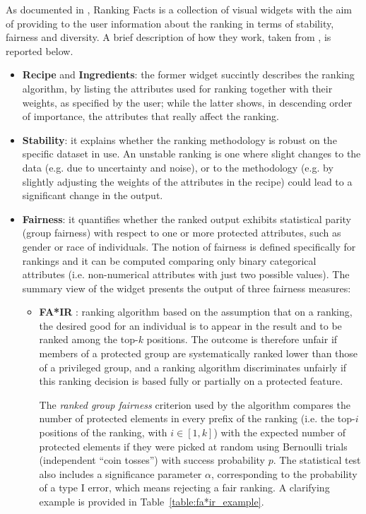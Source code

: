 As documented in \cite{yang2018nutritional}, Ranking Facts is a collection of visual widgets with the aim of providing to the user information about the ranking in terms of stability, fairness and diversity. A brief description of how they work, taken from \cite{yang2018nutritional}, is reported below.
\begin{itemize}
\item \textbf{Recipe} and \textbf{Ingredients}: the former widget succintly describes the ranking algorithm, by listing the attributes used for ranking together with their weights, as specified by the user; while the latter shows, in descending order of importance, the attributes that really affect the ranking.
\item \textbf{Stability}: it explains whether the ranking methodology is robust on the specific dataset in use. An unstable ranking is one where slight changes to the data (e.g. due to uncertainty and noise), or to the methodology (e.g. by slightly adjusting the weights of the attributes in the recipe) could lead to a significant change in the output.
\item \textbf{Fairness}: it quantifies whether the ranked output exhibits statistical parity (group fairness) with respect to one or more protected attributes, such as gender or race of individuals. The notion of fairness is defined specifically for rankings and it can be computed comparing only binary categorical attributes (i.e. non-numerical attributes with just two possible values). The summary view of the widget presents the output of three fairness measures:

\begin{itemize}
\item \textbf{FA*IR} \cite{zehlike2017fa*ir}: ranking algorithm based on the assumption that on a ranking, the desired good for an individual is to appear in the result and to be ranked among the top-\(k\) positions. The outcome is therefore unfair if members of a protected group are systematically ranked lower than those of a privileged group, and a ranking algorithm discriminates unfairly if this ranking decision is based fully or partially on a protected feature.

The \textit{ranked group fairness} criterion used by the algorithm compares the number of protected elements in every prefix of the ranking (i.e. the top-\(i\) positions of the ranking, with \(i \in [1, k]\)) with the expected number of protected elements if they were picked at random using Bernoulli trials (independent ``coin tosses'') with success probability \(p\). The statistical test also includes a significance parameter \(\alpha\), corresponding to the probability of a type I error, which means rejecting a fair ranking. A clarifying example is provided in Table~\ref{table:fa*ir_example}.


\end{itemize}
\end{itemize}
